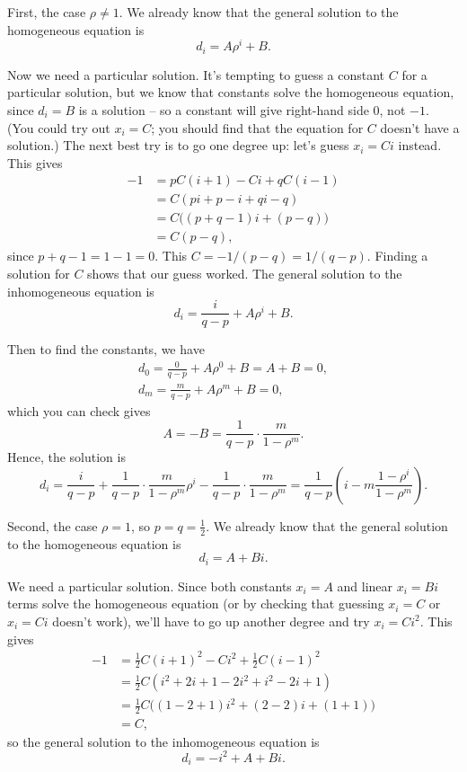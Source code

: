 \documentclass[
  a4paper,
]{article}
\theoremstyle{definition}
\theoremstyle{definition}
\theoremstyle{definition}
\theoremstyle{remark}
\begin{document}
First, the case \(\rho \neq 1\). We already know that the general solution to the homogeneous equation is
\[ d_i =  A \rho^i + B . \]

Now we need a particular solution. It's tempting to guess a constant \(C\) for a particular solution, but we know that constants solve the homogeneous equation, since \(d_i = B\) is a solution -- so a constant will give right-hand side \(0\), not \(-1\). (You could try out \(x_i = C\); you should find that the equation for \(C\) doesn't have a solution.) The next best try is to go one degree up: let's guess \(x_i = Ci\) instead. This gives
\begin{align*}
  -1 &= pC(i+1) - Ci + qC(i-1)\\
     &= C(pi + p - i + qi - q) \\
     &= C\big((p+q-1)i + (p-q)\big) \\
     &= C(p-q) ,
  \end{align*}
since \(p + q - 1 = 1 - 1 = 0\). This \(C = -1/(p-q) = 1/(q-p)\). Finding a solution for \(C\) shows that our guess worked. The general solution to the inhomogeneous equation is
\[ d_i = \frac{i}{q-p} + A \rho^i + B .  \]

Then to find the constants, we have
\begin{gather*} d_0 = \frac{0}{q-p} + A \rho^0 + B = A+B = 0, \\
                  d_m = \frac{m}{q-p} + A \rho^m + B = 0 , \end{gather*}
which you can check gives
\[ A = -B = \frac{1}{q-p} \cdot \frac{m}{1 - \rho^m} . \]
Hence, the solution is
\[ d_i = \frac{i}{q-p} + \frac{1}{q-p} \cdot \frac{m}{1 - \rho^m} \rho^i - \frac{1}{q-p} \cdot \frac{m}{1 - \rho^m} =  \frac{1}{q-p} \left(i - m\frac{1-\rho^i}{1- \rho^m} \right) . \]

Second, the case \(\rho = 1\), so \(p = q = \frac12\). We already know that the general solution to the homogeneous equation is
\[ d_i =  A + Bi . \]

We need a particular solution. Since both constants \(x_i = A\) and linear \(x_i = Bi\) terms solve the homogeneous equation (or by checking that guessing \(x_i = C\) or \(x_i = Ci\) doesn't work), we'll have to go up another degree and try \(x_i = Ci^2\). This gives
\begin{align*}
    -1 &= \tfrac12 C(i+1)^2 - Ci^2 + \tfrac 12 C(i-1)^2 \\
       &= \tfrac12 C(i^2 + 2i + 1 - 2i^2 + i^2 - 2i + 1) \\
       &= \tfrac12 C\big((1-2+1)i^2 + (2-2)i + (1+1)\big) \\
       &=C ,
\end{align*}
so the general solution to the inhomogeneous equation is
\[ d_i = -i^2 + A + Bi .  \]
\end{document}

